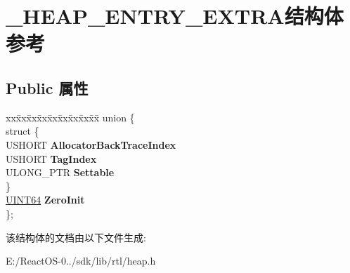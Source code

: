 \hypertarget{struct___h_e_a_p___e_n_t_r_y___e_x_t_r_a}{}\section{\+\_\+\+H\+E\+A\+P\+\_\+\+E\+N\+T\+R\+Y\+\_\+\+E\+X\+T\+R\+A结构体 参考}
\label{struct___h_e_a_p___e_n_t_r_y___e_x_t_r_a}
\subsection*{Public 属性}
\begin{DoxyCompactItemize}
\item 
\mbox{\label{struct___h_e_a_p___e_n_t_r_y___e_x_t_r_a_a64ba36a5c7f3b6df1c2455558f267c1a}} 
\begin{tabbing}
xx\=xx\=xx\=xx\=xx\=xx\=xx\=xx\=xx\=\kill
union \{\\
\mbox{\label{union___h_e_a_p___e_n_t_r_y___e_x_t_r_a_1_1_0D3653_a368b9ce3054ff73e88f5cda9302e99a0}} 
\>struct \{\\
\>\>USHORT {\bfseries AllocatorBackTraceIndex}\\
\>\>USHORT {\bfseries TagIndex}\\
\>\>ULONG\_PTR {\bfseries Settable}\\
\>\} \\
\>\hyperlink{_processor_bind_8h_a57be03562867144161c1bfee95ca8f7c}{UINT64} {\bfseries ZeroInit}\\
\}; \\

\end{tabbing}\end{DoxyCompactItemize}


该结构体的文档由以下文件生成\+:\begin{DoxyCompactItemize}
\item 
E\+:/\+React\+O\+S-\/0../sdk/lib/rtl/heap.\+h\end{DoxyCompactItemize}
